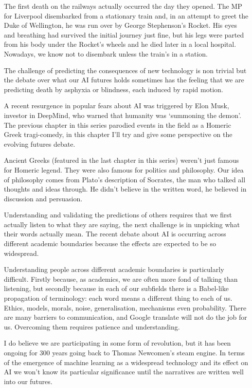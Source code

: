 \documentclass[a4paper]{caesar_book}
\begin{document}
The first death on the railways actually occurred the day they opened. The MP for Liverpool disembarked from a stationary train and, in an attempt to greet the Duke of Wellington, he was run over by George Stephenson’s Rocket. His eyes and breathing had survived the initial journey just fine, but his legs were parted from his body under the Rocket’s wheels and he died later in a local hospital. Nowadays, we know not to disembark unless the train’s in a station.

The challenge of predicting the consequences of new technology is non trivial but the debate over what our AI futures holds sometimes has the feeling that we are predicting death by asphyxia or blindness, each induced by rapid motion.

A recent resurgence in popular fears about AI was triggered by Elon Musk, investor in DeepMind, who warned that humanity was ‘summoning the demon’. The previous chapter in this series parodied events in the field as a Homeric Greek tragi-comedy, in this chapter I’ll try and give some perspective on the evolving futures debate.

Ancient Greeks (featured in the last chapter in this series) weren't just famous for Homeric legend. They were also famous for politics and philosophy. Our idea of philosophy comes from Plato’s description of Socrates, the man who talked all thoughts and ideas through. He didn't believe in the written word, he believed in discussion and persuasion.

Understanding and validating the predictions of others requires that we first actually listen to what they are saying, the next challenge is in unpicking what their words actually mean. The recent debate about AI is occurring across different academic boundaries because the effects are expected to be so widespread.

Understanding people across different academic boundaries is particularly difficult. Firstly because, as academics, we are often more fond of talking than listening, but secondly because in each of our subfields there is a Babel-like propagation of terminology: each word means a different thing to each of us. Ethics, models, morals, noise, generalisation, mechanisms even probability. There are many barriers to communication, and Google translate will not do the job for us. Overcoming them requires patience and understanding.

I do believe we are participating in some form of revolution, but it has been ongoing for 300 years going back to Thomas Newcomen’s steam engine. In terms of the emergence of machine learning as a widespread technology and its effect on AI we won’t know its particular significance until the narratives are written well into our futures.
\end{document}
